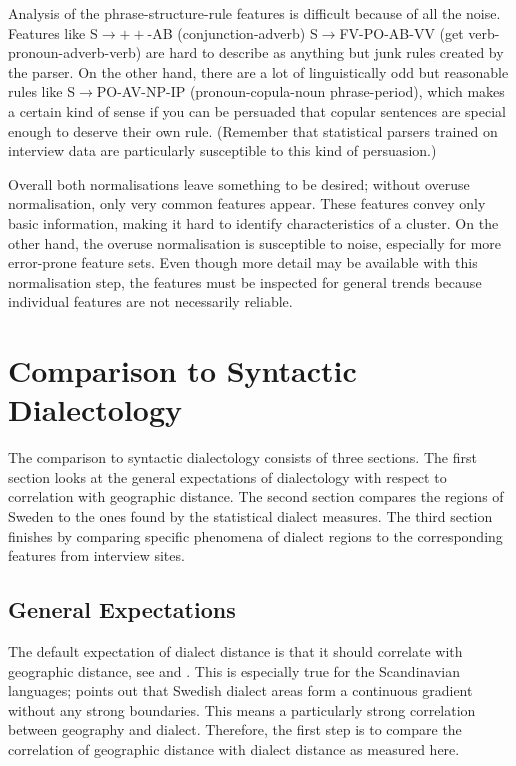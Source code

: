 Analysis of the phrase-structure-rule features is difficult because of
all the noise. Features like S$\to++$-AB (conjunction-adverb)
S$\to$FV-PO-AB-VV (get verb-pronoun-adverb-verb) are hard to describe
as anything but junk rules created by the parser. On the other hand,
there are a lot of linguistically odd but reasonable rules like
S$\to$PO-AV-NP-IP (pronoun-copula-noun phrase-period), which makes a
certain kind of sense if you can be persuaded that copular sentences
are special enough to deserve their own rule. (Remember that
statistical parsers trained on interview data are particularly
susceptible to this kind of persuasion.)

Overall both normalisations leave something to be desired; without
overuse normalisation, only very common features appear. These
features convey only basic information, making it hard to identify
characteristics of a cluster. On the other hand, the overuse
normalisation is susceptible to noise, especially for more error-prone
feature sets. Even though more detail may be available with this
normalisation step, the features must be inspected for general trends
because individual features are not necessarily reliable.

\section{Comparison to Syntactic Dialectology}

The comparison to syntactic dialectology consists of three
sections. The first section looks at the general expectations of
dialectology with respect to correlation with geographic distance. The
second section compares the regions of Sweden to the ones found by the
statistical dialect measures. The third section finishes by comparing
specific phenomena of dialect regions to the corresponding features
from interview sites.

\subsection{General Expectations}

The default expectation of dialect distance is that it should
correlate with geographic distance, see  and
. This is especially true for the Scandinavian
languages;  points out that Swedish dialect areas
form a continuous gradient without any strong boundaries. This means a
particularly strong correlation between geography and
dialect. Therefore, the first step is to compare the correlation of
geographic distance with dialect distance as measured
here.

